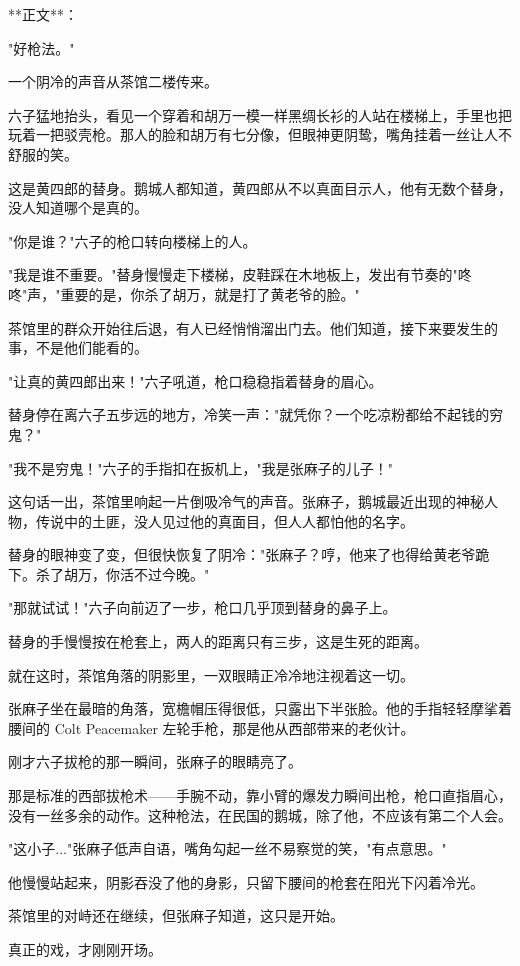 **正文**：

"好枪法。"

一个阴冷的声音从茶馆二楼传来。

六子猛地抬头，看见一个穿着和胡万一模一样黑绸长衫的人站在楼梯上，手里也把玩着一把驳壳枪。那人的脸和胡万有七分像，但眼神更阴鸷，嘴角挂着一丝让人不舒服的笑。

这是黄四郎的替身。鹅城人都知道，黄四郎从不以真面目示人，他有无数个替身，没人知道哪个是真的。

"你是谁？"六子的枪口转向楼梯上的人。

"我是谁不重要。"替身慢慢走下楼梯，皮鞋踩在木地板上，发出有节奏的"咚咚"声，"重要的是，你杀了胡万，就是打了黄老爷的脸。"

茶馆里的群众开始往后退，有人已经悄悄溜出门去。他们知道，接下来要发生的事，不是他们能看的。

"让真的黄四郎出来！"六子吼道，枪口稳稳指着替身的眉心。

替身停在离六子五步远的地方，冷笑一声："就凭你？一个吃凉粉都给不起钱的穷鬼？"

"我不是穷鬼！"六子的手指扣在扳机上，"我是张麻子的儿子！"

这句话一出，茶馆里响起一片倒吸冷气的声音。张麻子，鹅城最近出现的神秘人物，传说中的土匪，没人见过他的真面目，但人人都怕他的名字。

替身的眼神变了变，但很快恢复了阴冷："张麻子？哼，他来了也得给黄老爷跪下。杀了胡万，你活不过今晚。"

"那就试试！"六子向前迈了一步，枪口几乎顶到替身的鼻子上。

替身的手慢慢按在枪套上，两人的距离只有三步，这是生死的距离。

就在这时，茶馆角落的阴影里，一双眼睛正冷冷地注视着这一切。

张麻子坐在最暗的角落，宽檐帽压得很低，只露出下半张脸。他的手指轻轻摩挲着腰间的 Colt Peacemaker 左轮手枪，那是他从西部带来的老伙计。

刚才六子拔枪的那一瞬间，张麻子的眼睛亮了。

那是标准的西部拔枪术——手腕不动，靠小臂的爆发力瞬间出枪，枪口直指眉心，没有一丝多余的动作。这种枪法，在民国的鹅城，除了他，不应该有第二个人会。

"这小子..."张麻子低声自语，嘴角勾起一丝不易察觉的笑，"有点意思。"

他慢慢站起来，阴影吞没了他的身影，只留下腰间的枪套在阳光下闪着冷光。

茶馆里的对峙还在继续，但张麻子知道，这只是开始。

真正的戏，才刚刚开场。